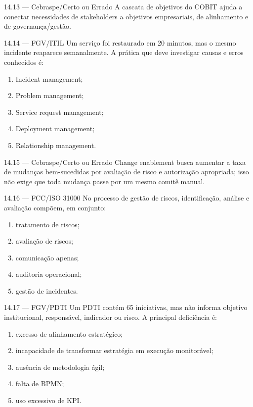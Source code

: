 \begin{questao}{ 14.13 — Cebraspe/Certo ou Errado}
A cascata de objetivos do COBIT ajuda a conectar necessidades de stakeholders a objetivos empresariais, de alinhamento e de governança/gestão.
\end{questao}

\begin{questao}{ 14.14 — FGV/ITIL}
Um serviço foi restaurado em 20 minutos, mas o mesmo incidente reaparece semanalmente. A prática que deve investigar causas e erros conhecidos é:
\begin{enumerate}[label=\Alph*)]
\item Incident management;
\item Problem management;
\item Service request management;
\item Deployment management;
\item Relationship management.
\end{enumerate}
\end{questao}

\begin{questao}{ 14.15 — Cebraspe/Certo ou Errado}
Change enablement busca aumentar a taxa de mudanças bem-sucedidas por avaliação de risco e autorização apropriada; isso não exige que toda mudança passe por um mesmo comitê manual.
\end{questao}

\begin{questao}{ 14.16 — FCC/ISO 31000}
No processo de gestão de riscos, identificação, análise e avaliação compõem, em conjunto:
\begin{enumerate}[label=\Alph*)]
\item tratamento de riscos;
\item avaliação de riscos;
\item comunicação apenas;
\item auditoria operacional;
\item gestão de incidentes.
\end{enumerate}
\end{questao}

\begin{questao}{ 14.17 — FGV/PDTI}
Um PDTI contém 65 iniciativas, mas não informa objetivo institucional, responsável, indicador ou risco. A principal deficiência é:
\begin{enumerate}[label=\Alph*)]
\item excesso de alinhamento estratégico;
\item incapacidade de transformar estratégia em execução monitorável;
\item ausência de metodologia ágil;
\item falta de BPMN;
\item uso excessivo de KPI.
\end{enumerate}
\end{questao}

